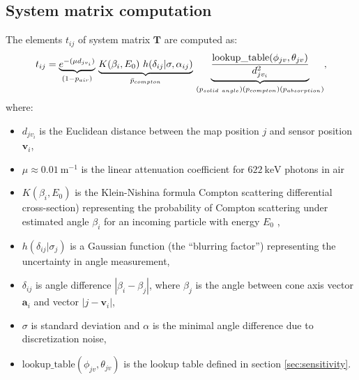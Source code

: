 \subsection{System matrix computation}
The elements $t_{ij}$ of system matrix $\mathbf{T}$ are computed as:
\begin{equation}
  t_{ij} = \underset{(1-p_{air})}{\underbrace{e^{-(\mu d_{jv_{i}})}}}\ 
  \underset{\bar{p}_{compton}} {  \underbrace{K(\beta_{i}, E_{0})\ h(\delta_{ij}|\sigma, \alpha_{ij})}} \
  \underset{(p_{solid\ angle})\\(p_{compton})\\(p_{absorption})} {\underbrace{\frac{\mathrm{lookup\_table}(\phi_{jv}, \theta_{jv})}{d_{jv_{i}}^{2}}}}
  ,%
  \label{eq:system_matrix_full}
\end{equation}
where:
\begin{itemize}
 \item $d_{jv_{i}}$ is the Euclidean distance between the map position $j$ and sensor position $\mathbf{v}_{i}$, 
 \item $\mu \approx \SI{0.01}{\meter^{-1}} $ is the linear attenuation coefficient for $\SI{622}{\kilo\electronvolt}$ photons in air\item $K(\beta_{i}, E_{0})$ is the Klein-Nishina formula Compton scattering differential cross-section) representing the probability of Compton scattering under estimated angle $\beta_{i}$ for an incoming particle with energy $E_{0}$ \cite{yuemeng_feng},
\item $h(\delta_{ij}|\sigma_{j})$ is a Gaussian function (the ``blurring factor'') representing the uncertainty in angle measurement,
\item $\delta_{ij}$ is angle difference $|\beta_{i}-\beta_{j}|$, where $\beta_{j}$ is the angle between cone axis vector $\mathbf{a}_{i}$ and vector $|j-\mathbf{v}_{i}|$, 
\item $\sigma$ is standard deviation and $\alpha$ is the minimal angle difference due to discretization noise,
\item $\mathrm{lookup\_table}(\phi_{jv}, \theta_{jv})$ is the lookup table defined in section \autoref{sec:sensitivity}.
\end{itemize}

